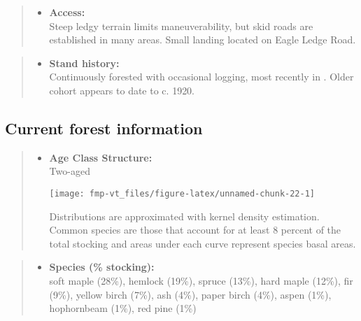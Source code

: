 \documentclass[]{tufte-handout}
\providecommand{\tightlist}{%
  \setlength{\itemsep}{0pt}\setlength{\parskip}{0pt}}
\begin{document}
\begin{quote}
\begin{itemize}
\tightlist
\item
  \textbf{Access:}\\
  \vspace{2pt} Steep ledgy terrain limits maneuverability, but skid
  roads are established in many areas. Small landing located on Eagle
  Ledge Road.
\end{itemize}
\end{quote}

\begin{quote}
\begin{itemize}
\tightlist
\item
  \textbf{Stand history:}\\
  \vspace{2pt} Continuously forested with occasional logging, most
  recently in . Older cohort appears to date to c. 1920.
\end{itemize}
\end{quote}

\subsection{Current forest
information}\label{current-forest-information-4}

\begin{quote}
\begin{itemize}
\tightlist
\item
  \textbf{Age Class Structure:}\\
  \vspace{2pt} Two-aged\\

  \begin{marginfigure}
  \texttt{[image: fmp-vt\_files/figure-latex/unnamed-chunk-22-1]} \caption[Distributions are approximated with kernel density estimation]{Distributions are approximated with kernel density estimation. Common species are those that account for at least 8 percent of the total stocking and areas under each curve represent species basal areas.}\label{fig:unnamed-chunk-22}
  \end{marginfigure}
\end{itemize}
\end{quote}

\begin{quote}
\begin{itemize}
\tightlist
\item
  \textbf{Species (\% stocking):}\\
  \vspace{2pt} soft maple (28\%), hemlock (19\%), spruce (13\%), hard
  maple (12\%), fir (9\%), yellow birch (7\%), ash (4\%), paper birch
  (4\%), aspen (1\%), hophornbeam (1\%), red pine (1\%)
\end{itemize}
\end{quote}
\end{document}

